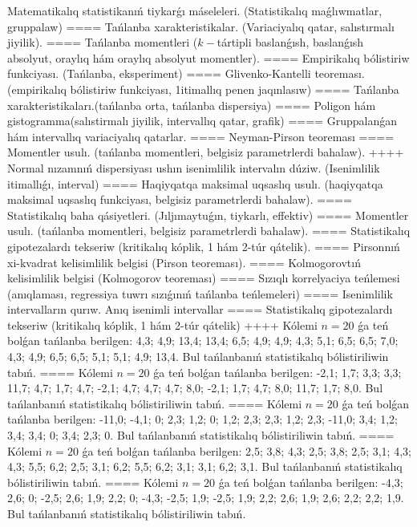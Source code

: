 Matematikalıq statistikanıń tiykarǵı máseleleri. (Statistikalıq maǵlıwmatlar, gruppalaw)
====
Tańlanba xarakteristikalar. (Variaciyalıq qatar, salıstırmalı jiyilik).
====
Tańlanba momentleri (\(k -\)tártipli baslanǵısh, baslanǵısh absolyut, oraylıq hám oraylıq absolyut momentler).
====
Empirikalıq bólistiriw funkciyası. (Tańlanba, eksperiment)
====
Glivenko-Kantelli teoreması. (empirikalıq bólistiriw funkciyası, 1itimallıq penen jaqınlasıw)
====
Tańlanba xarakteristikaları.(tańlanba orta, tańlanba dispersiya)
====
Poligon hám gistogramma(salıstirmalı jiyilik, intervallıq qatar, grafik)
====
Gruppalanǵan hám intervallıq variaciyalıq qatarlar.
====
Neyman-Pirson teoreması
====
Momentler usulı. (tańlanba momentleri, belgisiz parametrlerdi bahalaw).
++++
Normal nızamnıń dispersiyası ushın isenimlilik intervalın dúziw. (Isenimlilik itimallıǵı, interval)
====
Haqiyqatqa maksimal uqsaslıq usulı. (haqiyqatqa maksimal uqsaslıq funkciyası, belgisiz parametrlerdi bahalaw).
====
Statistikalıq baha qásiyetleri. (Jıljımaytuǵın, tiykarlı, effektiv)
====
Momentler usulı. (tańlanba momentleri, belgisiz parametrlerdi bahalaw).
====
Statistikalıq gipotezalardı tekseriw (kritikalıq kóplik, 1 hám 2-túr qátelik).
====
Pirsonnıń xi-kvadrat kelisimlilik belgisi (Pirson teoreması).
====
Kolmogorovtıń kelisimlilik belgisi (Kolmogorov teoreması)
====
Sızıqlı korrelyaciya teńlemesi (anıqlaması, regressiya tuwrı sızıǵınıń tańlanba teńlemeleri)
====
Isenimlilik intervalların qurıw. Anıq isenimli intervallar
====
Statistikalıq gipotezalardı tekseriw (kritikalıq kóplik, 1 hám 2-túr qátelik)
++++
Kólemi \(n = 20\) ǵa teń bolǵan tańlanba berilgen: 4,3; 4,9; 13,4; 13,4; 6,5; 4,9; 4,9; 4,3; 5,1; 6,5; 6,5; 7,0; 4,3; 4,9; 6,5; 6,5; 5,1; 5,1; 4,9; 13,4. Bul tańlanbanıń statistikalıq bólistiriliwin tabıń.
====
Kólemi \(n = 20\) ǵa teń bolǵan tańlanba berilgen: -2,1; 1,7; 3,3; 3,3; 11,7; 4,7; 1,7; 4,7; -2,1; 4,7; 4,7; 4,7; 8,0; -2,1; 1,7; 4,7; 8,0; 11,7; 1,7; 8,0. Bul tańlanbanıń statistikalıq bólistiriliwin tabıń.
====
Kólemi \(n = 20\) ǵa teń bolǵan tańlanba berilgen: -11,0; -4,1; 0; 2,3; 1,2; 0; 1,2; 2,3; 2,3; 1,2; 2,3; -11,0; 3,4; 1,2; 3,4; 3,4; 0; 3,4; 2,3; 0. Bul tańlanbanıń statistikalıq bólistiriliwin tabıń.
====
Kólemi \(n = 20\) ǵa teń bolǵan tańlanba berilgen: 2,5; 3,8; 4,3; 2,5; 3,8; 2,5; 3,1; 4,3; 4,3; 5,5; 6,2; 2,5; 3,1; 6,2; 5,5; 6,2; 3,1; 3,1; 6,2; 3,1. Bul tańlanbanıń statistikalıq bólistiriliwin tabıń.
====
Kólemi \(n = 20\) ǵa teń bolǵan tańlanba berilgen: -4,3; 2,6; 0; -2,5; 2,6; 1,9; 2,2; 0; -4,3; -2,5; 1,9; -2,5; 1,9; 2,2; 2,6; 1,9; 2,6; 2,2; 2,2; 1,9. Bul tańlanbanıń statistikalıq bólistiriliwin tabıń.
